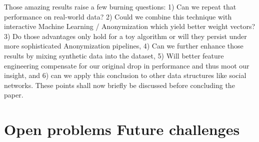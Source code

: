 \documentclass{llncs}
\begin{document}
Those amazing results raise a few burning questions: 1) Can we repeat that performance on real-world data? 2) Could we combine this technique with interactive Machine Learning / Anonymization which yield better weight vectors? 3) Do those advantages only hold for a toy algorithm or will they persist under more sophisticated Anonymization pipelines, 4) Can we further enhance those results by mixing synthetic data into the dataset, 5) Will better feature engineering compensate for our original drop in performance and thus moot our insight, and 6) can we apply this conclusion to other data structures like social networks. These points shall now briefly be discussed before concluding the paper.


\section{Open problems Future challenges}
\label{sect:op_fc}

	
	
	
	
\end{document}
